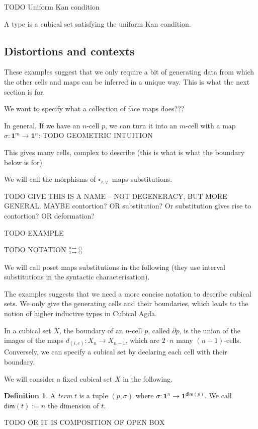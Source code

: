 \documentclass[11pt]{article}
\theoremstyle{definition}
\newtheorem{definition}{Definition}
\newcommand{\mdef}{:=}
\newcommand{\mname}[1]{\textit{{#1}}}
\newcommand{\join}{\wedge}
\newcommand{\meet}{\vee}
\newcommand{\dedekind}{\square_{\join \meet}}
\newcommand{\pint}[1]{\mathbf{1}^{#1}}
\renewcommand{\dim}[1]{\mathsf{dim}({#1})}
\newcommand{\dmap}[2]{d_{({#1} , {#2})}}
\newcommand{\substtwo}[2]{\tiny
  \arraycolsep=.4pt\def\arraystretch{1}
  \begin{array}{ll}
    0 &\mapsto {#1} \\
    1 &\mapsto {#2}
  \end{array}
}
\newcommand{\constzero}{\substtwo{()}{()}}
\begin{document}
TODO Uniform Kan condition

A type is a cubical set satisfying the uniform Kan condition.

\subsection{Distortions and contexts} %

These examples suggest that we only require a bit of generating data from which
the other cells and maps can be inferred in a unique way. This is what the next
section is for.

We want to specify what a collection of face maps does???

In general, 
If we have an $n$-cell $p$, we can turn it into an $m$-cell with a map $\sigma :
\pint{m} \to \pint{n}$: TODO GEOMETRIC INTUITION

This gives many cells, complex to describe (this is what is what the boundary
below is for)

We will call the morphisms of $\dedekind$ maps substitutions.

TODO GIVE THIS IS A NAME -- NOT DEGENERACY, BUT MORE GENERAL. MAYBE contortion?
OR substitution? Or substitution gives rise to contortion?
OR deformation?

TODO EXAMPLE

TODO NOTATION $\constzero$ 

We will call poset maps substitutions in the following (they use interval
substitutions in the syntactic characterisation).



The examples suggests that we need a more concise notation to describe cubical
sets. We only give the generating cells and their boundaries, which leads to the
notion of higher inductive types in Cubical Agda.

In a cubical set $X$, the boundary of an $n$-cell $p$, called $\partial p$, is
the union of the images of the maps $\dmap{i}{e} : X_n \to X_{n-1}$, which are
$2 \cdot n$ many $(n-1)$-cells. Conversely, we can specify a cubical set by
declaring each cell with their boundary. 


We will consider a fixed cubical set $X$ in the following.

\begin{definition}
  A \mname{term} $t$ is a tuple $(p, \sigma)$ where $\sigma : \pint{n} \to
  \pint{\dim{p}}$. We call $\dim{t} \mdef n$ the dimension of $t$.

  TODO OR IT IS COMPOSITION OF OPEN BOX
\end{definition}
\end{document}
